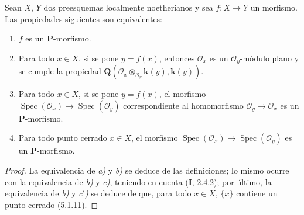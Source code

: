 \begin{lemma}[7.3.2]
\label{IV.2.s7.3.2-fr}
Sean $X$, $Y$ dos preesquemas localmente noetherianos y sea
$f:X\to Y$ un morfismo. Las propiedades siguientes son equivalentes:
\begin{enumerate}
\item[\emph{a)}] $f$ es un $\boldsymbol P$-morfismo.
\item[\emph{b)}] Para todo $x\in X$, si se pone $y=f(x)$, entonces
$\mathscr O_x$ es un $\mathscr O_y$-módulo plano y se cumple la
propiedad
$\boldsymbol Q(\mathscr O_x\otimes_{\mathscr O_y}\boldsymbol{k}(y),\boldsymbol{k}(y))$.
\item[\emph{c)}] Para todo $x\in X$, si se pone $y=f(x)$, el
morfismo
$\operatorname{Spec}(\mathscr O_x)\to\operatorname{Spec}(\mathscr O_y)$
correspondiente al homomorfismo $\mathscr O_y\to\mathscr O_x$ es un
$\boldsymbol P$-morfismo.
\item[\emph{c$'$)}] Para todo punto cerrado $x\in X$, el morfismo
$\operatorname{Spec}(\mathscr O_x)\to\operatorname{Spec}(\mathscr O_y)$
es un $\boldsymbol P$-morfismo.
\end{enumerate}
\end{lemma}

\begin{proof}
La equivalencia de \emph{a)} y \emph{b)} se deduce de las definiciones; lo mismo
ocurre con la equivalencia de \emph{b)} y \emph{c)}, teniendo en cuenta (\textbf{I}, 2.4.2);
por último, la equivalencia de \emph{b)} y \emph{c$'$)} se deduce de que, para todo
$x\in X$, $\overline{\{x\}}$ contiene un punto cerrado (5.1.11).
\end{proof}
